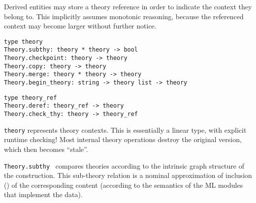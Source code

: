 \begin{isabellebody}
\begin{isamarkuptext}
  Derived entities may store a theory reference in order to indicate
  the context they belong to.  This implicitly assumes monotonic
  reasoning, because the referenced context may become larger without
  further notice.%
\end{isamarkuptext}%
\isamarkuptrue%
%
\isadelimmlref
%
\endisadelimmlref
%
\isatagmlref
%
\begin{isamarkuptext}%
\begin{mldecls}
  \verb|type theory| \\
  \verb|Theory.subthy: theory * theory -> bool| \\
  \verb|Theory.checkpoint: theory -> theory| \\
  \verb|Theory.copy: theory -> theory| \\
  \verb|Theory.merge: theory * theory -> theory| \\
  \verb|Theory.begin_theory: string -> theory list -> theory| \\
  \end{mldecls}
  \begin{mldecls}
  \verb|type theory_ref| \\
  \verb|Theory.deref: theory_ref -> theory| \\
  \verb|Theory.check_thy: theory -> theory_ref| \\
  \end{mldecls}

  \begin{description}

  \item \verb|theory| represents theory contexts.  This is
  essentially a linear type, with explicit runtime checking!  Most
  internal theory operations destroy the original version, which then
  becomes ``stale''.

  \item \verb|Theory.subthy|~ compares theories
  according to the intrinsic graph structure of the construction.
  This sub-theory relation is a nominal approximation of inclusion
  (\isa{{\isasymsubseteq}}) of the corresponding content (according to the
  semantics of the ML modules that implement the data).


\end{description}
\end{isamarkuptext}
\end{isabellebody}
